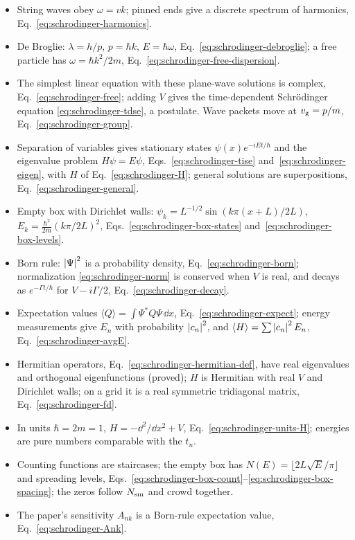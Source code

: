 \begin{itemize}
\item String waves obey $\omega=vk$; pinned ends give a discrete spectrum of harmonics, Eq.~\eqref{eq:schrodinger-harmonics}.
\item De Broglie: $\lambda=h/p$, $p=\hbar k$, $E=\hbar\omega$, Eq.~\eqref{eq:schrodinger-debroglie}; a free particle has $\omega=\hbar k^2/2m$, Eq.~\eqref{eq:schrodinger-free-dispersion}.
\item The simplest linear equation with these plane-wave solutions is complex, Eq.~\eqref{eq:schrodinger-free}; adding $V$ gives the time-dependent Schr\"odinger equation \eqref{eq:schrodinger-tdse}, a postulate. Wave packets move at $v_{\rm g}=p/m$, Eq.~\eqref{eq:schrodinger-group}.
\item Separation of variables gives stationary states $\psi(x)e^{-iEt/\hbar}$ and the eigenvalue problem $H\psi=E\psi$, Eqs.~\eqref{eq:schrodinger-tise} and~\eqref{eq:schrodinger-eigen}, with $H$ of Eq.~\eqref{eq:schrodinger-H}; general solutions are superpositions, Eq.~\eqref{eq:schrodinger-general}.
\item Empty box with Dirichlet walls: $\psi_k=L^{-1/2}\sin(k\pi(x+L)/2L)$, $E_k=\frac{\hbar^2}{2m}(k\pi/2L)^2$, Eqs.~\eqref{eq:schrodinger-box-states} and~\eqref{eq:schrodinger-box-levels}.
\item Born rule: $\left\lvert \Psi\right\rvert^2$ is a probability density, Eq.~\eqref{eq:schrodinger-born}; normalization \eqref{eq:schrodinger-norm} is conserved when $V$ is real, and decays as $e^{-\Gamma t/\hbar}$ for $V-i\Gamma/2$, Eq.~\eqref{eq:schrodinger-decay}.
\item Expectation values $\langle Q\rangle=\int\Psi^*Q\Psi\,\dd x$, Eq.~\eqref{eq:schrodinger-expect}; energy measurements give $E_n$ with probability $\left\lvert c_n\right\rvert^2$, and $\langle H\rangle=\sum\left\lvert c_n\right\rvert^2E_n$, Eq.~\eqref{eq:schrodinger-avgE}.
\item Hermitian operators, Eq.~\eqref{eq:schrodinger-hermitian-def}, have real eigenvalues and orthogonal eigenfunctions (proved); $H$ is Hermitian with real $V$ and Dirichlet walls; on a grid it is a real symmetric tridiagonal matrix, Eq.~\eqref{eq:schrodinger-fd}.
\item In units $\hbar=2m=1$, $H=-\dd^2/\dd x^2+V$, Eq.~\eqref{eq:schrodinger-units-H}; energies are pure numbers comparable with the $t_n$.
\item Counting functions are staircases; the empty box has $N(E)=\lfloor2L\sqrt E/\pi\rfloor$ and spreading levels, Eqs.~\eqref{eq:schrodinger-box-count}--\eqref{eq:schrodinger-box-spacing}; the zeros follow $N_{\mathrm{sm}}$ and crowd together.
\item The paper's sensitivity $A_{nk}$ is a Born-rule expectation value, Eq.~\eqref{eq:schrodinger-Ank}.
\end{itemize}

